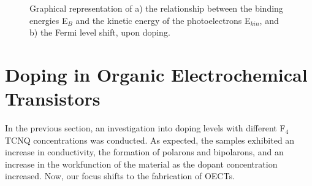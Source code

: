 \begin{figure}[ht]
	\centering
	\caption[Representation of the Fermi level shift upon doping]{ Graphical representation of a) the relationship between the binding energies E$_{B}$ and the kinetic energy of the photoelectrons E$_{kin}$, and b) the Fermi level shift, upon doping.} 
	\label{fig:ups}
\end{figure}


\section{Doping in Organic Electrochemical Transistors}
In the previous section, an investigation into doping levels with different F$_{4}$TCNQ concentrations was conducted. As expected, the samples exhibited an increase in conductivity, the formation of polarons and bipolarons, and an increase in the workfunction of the material as the dopant concentration increased. Now, our focus shifts to the fabrication of OECTs.

